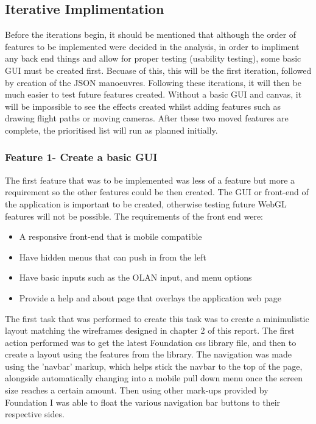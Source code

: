 \subsection{Iterative Implimentation}
Before the iterations begin, it should be mentioned that although the order of features to be implemented were decided in the analysis, in order to impliment any back end things and allow for proper testing (usability testing), some basic GUI must be created first. Becuase of this, this will be the first iteration, followed by creation of the JSON manoeuvres. Following these iterations, it will then be much easier to test future features created. Without a basic GUI and canvas, it will be impossible to see the effects created whilst adding features such as drawing flight paths or moving cameras. After these two moved features are complete, the prioritised list will run as planned initially.

\subsubsection{Feature 1- Create a basic GUI}
The first feature that was to be implemented was less of a feature but more a requirement so the other features could be then created. The GUI or front-end of the application is important to be created, otherwise testing future WebGL features will not be possible. The requirements of the front end were:

\begin{itemize}
\item A responsive front-end that is mobile compatible
\item Have hidden menus that can push in from the left
\item Have basic inputs such as the OLAN input, and menu options
\item Provide a help and about page that overlays the application web page
\end{itemize}

The first task that was performed to create this task was to create a minimulistic layout matching the wireframes designed in chapter 2 of this report. The first action performed was to get the latest Foundation \cite{foundation} css library file, and then to create a layout using the features from the library. The navigation was made using the 'navbar' markup, which helps stick the navbar to the top of the page, alongside automatically changing into a mobile pull down menu once the screen size reaches a certain amount. Then using other mark-ups provided by Foundation I was able to float the various navigation bar buttons to their respective sides. 

